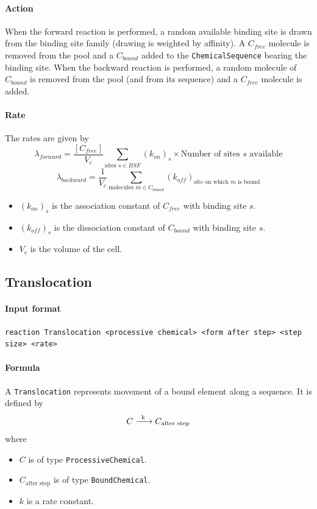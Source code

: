 \documentclass[12pt]{article}
\theoremstyle{definition}
\theoremstyle{remark}
\numberwithin{equation}{section}
\newcommand{\reactionIrr}[4]{#1 \ce{->[#3][#4]} #2}
\begin{document}
\paragraph{Action} When the forward reaction is performed, a random available binding site is drawn from the binding site family (drawing is weighted by affinity). A $C_{free}$ molecule is removed from the pool and a $C_{bound}$ added to the \texttt{ChemicalSequence} bearing the binding site. When the backward reaction is performed, a random molecule of $C_{bound}$ is removed from the pool (and from its sequence) and a $C_{free}$ molecule is added.

\paragraph{Rate} The rates are given by
$$
	\lambda_{forward} = \frac{[C_{free}]}{V_c} \sum_{\text{sites }s \in BSF} (k_{on})_s \times \text{Number of sites $s$ available}
$$ 
$$
	\lambda_{backward} = \frac{1}{V_c} \sum_{\text{molecules }m \in C_{bound}} (k_{off})_\text{site on which $m$ is bound}
$$
\begin{itemize}
	\item $(k_{on})_s$ is the association constant of $C_{free}$ with binding site $s$.
	\item $(k_{off})_s$ is the dissociation constant of $C_{bound}$ with binding site $s$.
	\item $V_c$ is the volume of the cell.
\end{itemize}

\subsection{Translocation}
\paragraph{Input format}
\begin{verbatim}
reaction Translocation <processive chemical> <form after step> <step size> <rate>
\end{verbatim}

\paragraph{Formula} A \texttt{Translocation} represents movement of a bound element along a sequence. It is defined by
$$
	\reactionIrr{C}{C_\text{after step}}{k}{}
$$
where
\begin{itemize}
	\item $C$ is of type \texttt{ProcessiveChemical}.
	\item $C_\text{after step}$ is of type \texttt{BoundChemical}.
	\item $k$ is a rate constant.
\end{itemize}
\end{document}
